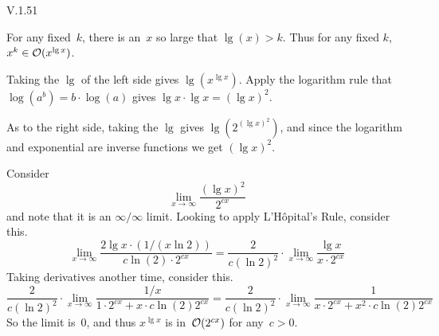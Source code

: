 \begin{ans}{V.1.51}
  \begin{exparts}
  \item For any fixed~$k$, there is an~$x$ so large that $\lg(x)>k$.
   Thus for any fixed $k$, $x^k\in\operatorname*{\mathcal{O}}(x^{\lg x})$.
  \item Taking the $\lg$ of the left side gives
    $\lg(x^{\lg x})$.
    Apply the logarithm rule that $\log(a^b)=b\cdot\log(a)$ gives
    $\lg x\cdot\lg x=(\lg x)^2$.

    As to the right side, taking the $\lg$ gives $\lg(2^{(\lg x)^2})$,
    and since the logarithm and exponential are inverse functions
    we get $(\lg x)^2$.
  \item Consider
  \begin{equation*}
    \lim_{x\to\infty}\frac{(\lg x)^2}{2^{cx}}
  \end{equation*}
  and note that it is an $\infty/\infty$ limit.
  Looking to apply L'H\^{o}pital's Rule, consider this.
  \begin{equation*}
    \lim_{x\to\infty}\frac{2\lg x\cdot (1/(x\ln 2))}{c\ln(2)\cdot 2^{cx}}
    =\frac{2}{c(\ln 2)^2}\cdot\lim_{x\to\infty}\frac{\lg x}{x\cdot 2^{cx}}
  \end{equation*}
  Taking derivatives another time, consider this.
  \begin{equation*}
    \frac{2}{c(\ln 2)^2}\cdot
      \lim_{x\to\infty}\frac{1/x}{1\cdot 2^{cx}+x\cdot  c\ln(2)2^{cx}}
    =\frac{2}{c(\ln 2)^2}\cdot
      \lim_{x\to\infty}\frac{1}{x\cdot 2^{cx}+x^2\cdot  c\ln(2)2^{cx}}
  \end{equation*}
  So the limit is~$0$, and thus $x^{\lg x}$ is in~$\operatorname*{\mathcal{O}}(2^{cx})$
  for any~$c>0$.
  \end{exparts}
  
\end{ans}
%
%
%
%
